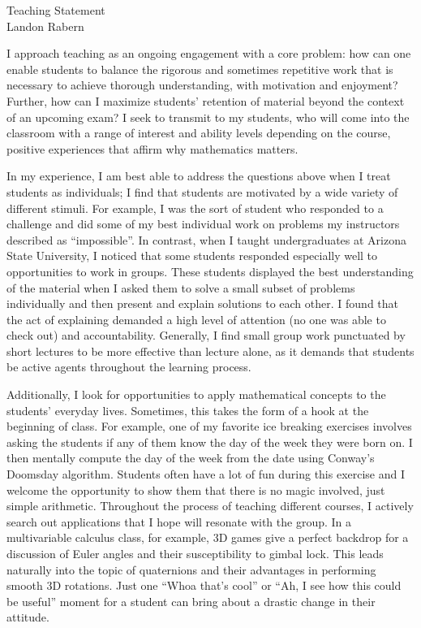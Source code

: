 \documentclass[12pt]{article}
\begin{document}


\begin{center}
{\Large \sc Teaching Statement}\\
{\sc Landon Rabern}
\end{center}

\vspace{.4in}

I approach teaching as an ongoing engagement with a core problem: how can one enable students to balance the rigorous and sometimes repetitive work that is necessary to achieve thorough understanding, with motivation and enjoyment? Further, how can I maximize students' retention of material beyond the context of an upcoming exam? I seek to transmit to my students, who will come into the classroom with a range of interest and ability levels depending on the course, positive experiences that affirm why mathematics matters.

In my experience, I am best able to address the questions above when I treat students as individuals; I find that students are motivated by a wide variety of different stimuli. For example, I was the sort of student who responded to a challenge and did some of my best individual work on problems my instructors described as ``impossible''. In contrast, when I taught undergraduates at Arizona State University, I noticed that some students responded especially well to opportunities to work in groups. These students displayed the best understanding of the material when I asked them to solve a small subset of problems individually and then present and explain solutions to each other. I found that the act of explaining demanded a high level of attention (no one was able to check out) and accountability. Generally, I find small group work punctuated by short lectures to be more effective than lecture alone, as it demands that students be active agents throughout the learning process.

Additionally, I look for opportunities to apply mathematical concepts to the students' everyday lives. Sometimes, this takes the form of a hook at the beginning of class. For example, one of my favorite ice breaking exercises involves asking the students if any of them know the day of the week they were born on. I then mentally compute the day of the week from the date using Conway's Doomsday algorithm. Students often have a lot of fun during this exercise and I welcome the opportunity to show them that there is no magic involved, just simple arithmetic. Throughout the process of teaching different courses, I actively search out applications that I hope will resonate with the group. In a multivariable calculus class, for example, 3D games give a perfect backdrop for a discussion of Euler angles and their susceptibility to gimbal lock.  This leads naturally into the topic of quaternions and their advantages in performing smooth 3D rotations.  Just one ``Whoa that's cool'' or ``Ah, I see how this could be useful'' moment for a student can bring about a drastic change in their attitude.
\end{document}
